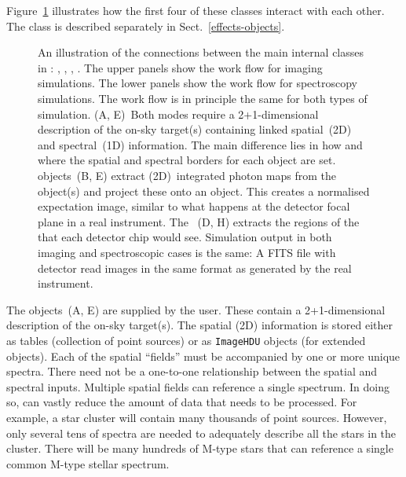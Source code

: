 Figure~\ref{fig:workflow} illustrates how the first four of these
classes interact with each other.  The \Effect{} class is described
separately in Sect.~\ref{effects-objects}.

\begin{figure}
  \caption{An illustration of the connections between the main
    internal classes in \ScopeSim{}: \Source{}, \FieldOfView{},
    \ImagePlane{}, \DetectorArray{}.  The upper panels show the work
    flow for imaging simulations.  The lower panels show the work flow
    for spectroscopy simulations.  The work flow is in principle the
    same for both types of simulation.  (A, E)~Both modes require a
    2+1-dimensional description of the on-sky target(s) containing
    linked spatial~(2D) and spectral~(1D) information.  The main
    difference lies in how and where the spatial and spectral borders
    for each \FieldOfView{} object are set.  \FieldOfView{}
    objects~(B, E) extract (2D)~integrated photon maps from the
    \Source{} object(s) and project these onto an \ImagePlane{}
    object.  This creates a normalised expectation image, similar to
    what happens at the detector focal plane in a real instrument.
    The \DetectorArray{}~(D, H) extracts the regions of the
    \ImagePlane{} that each detector chip would see.  Simulation
    output in both imaging and spectroscopic cases is the same: A FITS
    file with detector read images in the same format as generated by
    the real instrument.}
  \label{fig:workflow}
\end{figure}

The \Source{} objects~(A, E) are supplied by the user.  These contain
a 2+1-dimensional description of the on-sky target(s).  The spatial
(2D) information is stored either as tables (collection of point
sources) or as \lstinline{ImageHDU} objects (for extended objects).
Each of the spatial ``fields'' must be accompanied by one or more
unique spectra.  There need not be a one-to-one relationship between
the spatial and spectral inputs.  Multiple spatial fields can
reference a single spectrum.  In doing so, \ScopeSim{} can vastly
reduce the amount of data that needs to be processed.  For example, a
star cluster will contain many thousands of point sources.  However,
only several tens of spectra are needed to adequately describe all the
stars in the cluster.  There will be many hundreds of M-type stars
that can reference a single common M-type stellar spectrum.

